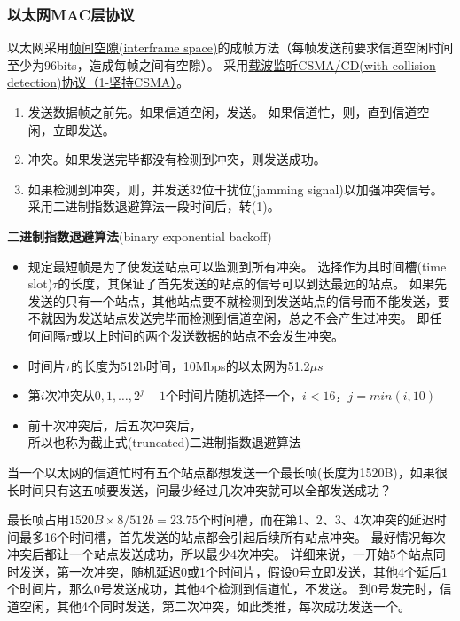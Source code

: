 \subsubsection{以太网MAC层协议}
以太网采用\underline{帧间空隙(interframe space)}的成帧方法（每帧发送前要求信道空闲时间至少为96bits，造成每帧之间有空隙）。
采用\underline{载波监听CSMA/CD(with collision detection)协议（1-坚持CSMA）}。
\begin{enumerate}
	\item 发送数据帧之前先。如果信道空闲，发送。
	如果信道忙，则，直到信道空闲，立即发送。
	\item {}冲突。如果发送完毕都没有检测到冲突，则发送成功。
	\item 如果检测到冲突，则，并发送32位干扰位(jamming signal)以加强冲突信号。
	采用二进制指数退避算法一段时间后，转(1)。
\end{enumerate}

\myhline
\textbf{二进制指数退避算法}(binary exponential backoff)
\begin{itemize}
	\item 规定最短帧是为了使发送站点可以监测到所有冲突。
	选择作为其时间槽(time slot)$\tau$的长度，其保证了首先发送的站点的信号可以到达最远的站点。
	如果先发送的只有一个站点，其他站点要不就检测到发送站点的信号而不能发送，要不就因为发送站点发送完毕而检测到信道空闲，总之不会产生过冲突。
	即任何间隔$\tau$或以上时间的两个发送数据的站点不会发生冲突。
	\item 时间片$\tau$的长度为512b时间，10Mbps的以太网为51.2$\mu s$
	\item 第$i$次冲突从$0,1,\ldots,2^j-1$个时间片随机选择一个，$i<16$，$j = min(i,10)$
	\item 前十次冲突后，后五次冲突后，\\
	所以也称为截止式(truncated)二进制指数退避算法
\end{itemize}

\begin{example}
	当一个以太网的信道忙时有五个站点都想发送一个最长帧(长度为1520B)，如果很长时间只有这五帧要发送，问最少经过几次冲突就可以全部发送成功？
\end{example}
\begin{analysis}
	最长帧占用$1520B\times 8/512b=23.75$个时间槽，而在第1、2、3、4次冲突的延迟时间最多16个时间槽，首先发送的站点都会引起后续所有站点冲突。
	最好情况每次冲突后都让一个站点发送成功，所以最少4次冲突。
	详细来说，一开始5个站点同时发送，第一次冲突，随机延迟0或1个时间片，假设0号立即发送，其他4个延后1个时间片，那么0号发送成功，其他4个检测到信道忙，不发送。
	到0号发完时，信道空闲，其他4个同时发送，第二次冲突，如此类推，每次成功发送一个。
\end{analysis}

